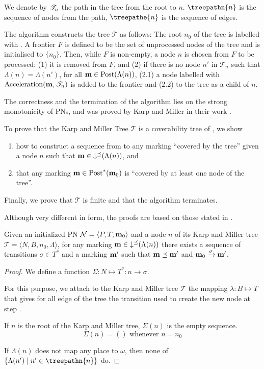 We denote by $\mathscr{T}_{n}$ the path in the tree from the root to $n$.
$\treepathn{n}$ is the sequence of nodes from the path, $\treepathe{n}$ is the sequence of edges.

The algorithm constructs the tree $\mathcal{T}$ as follows:
The root $n_0$ of the tree is labelled with \mari.
A frontier $F$ is defined to be the set of unprocessed nodes of the tree and is initialised to $\{n_0\}$.
Then, while $F$ is non-empty, a node $n$ is chosen from $F$ to be processed:
(1) it is removed from $F$, and (2) if there is no node $n'$ in $\mathscr{T}_n$ such that $\Lambda(n) = \Lambda(n')$, for all \omark $\mathbf{m} \in \operatorname{Post}(\Lambda(n))$, (2.1) a node labelled with $\operatorname{Acceleration}(\mathbf{m}, \mathscr{T}_n)$ is added to the frontier and (2.2) to the tree as a child of $n$.

The correctness and the termination of the algorithm lies on the strong monotonicity of \acp{PN}, and was proved by Karp and Miller in their work \cite{Karp69}.


To prove that the Karp and Miller Tree $\mathcal{T}$ is a coverability tree of \N, we show
\begin{enumerate}
  \item how to construct a sequence from \mari to any marking \mar “covered by the tree” given a node $n$ such that $\mathbf{m} \in \operatorname{\downarrow^\preceq}(\Lambda(n))$, and
  \item that any marking $\mathbf{m} \in \operatorname{Post}^*(\mathbf{m}_0)$ is “covered by at least one node of the tree”.
\end{enumerate}

Finally, we prove that $\mathcal{T}$ is finite and that the algorithm terminates.

Although very different in form, the proofs are based on those stated in \cite{Karp69}.

\begin{lemm}
  Given an initialized \ac{PN} $\mathcal{N} = \langle P,T, \mathbf{m}_0\rangle$ and a node $n$ of its Karp and Miller tree $\mathcal{T} = \langle N, B, n_0, \Lambda\rangle$,
  for any marking $\mathbf{m} \in \operatorname{\downarrow^\preceq}(\Lambda(n))$ there exists a sequence of transitions $\sigma \in T^*$ and a marking $\mathbf{m'}$ such that $\mathbf{m} \preceq \mathbf{m'}$ and $\mathbf{m}_0 \xrightarrow{\sigma} \mathbf{m'}$.
\end{lemm}
\begin{proof}
  We define a function $\Sigma : N \mapsto T^* : n \rightarrow \sigma$.

  For this purpose, we attach to the Karp and Miller tree $\mathcal{T}$ the mapping $\lambda : B \mapsto T$ that gives for all edge of the tree the transition used to create the new node at step .

  If $n$ is the root of the Karp and Miller tree, $\Sigma(n)$ is the empty sequence.
  \[ \Sigma(n) = () \text{ whenever } n = n_0 \]

  If $\Lambda(n)$ does not map any place to $\omega$, then none of $\left\{\Lambda(n') \mid n' \in \treepathn{n}\right\}$ do.

\end{proof}

